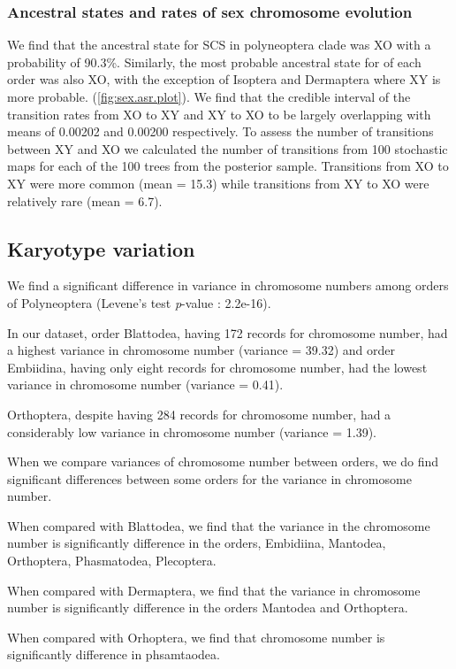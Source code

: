

\subsubsection{Ancestral states and rates of sex chromosome evolution}

We find that the ancestral state for SCS in polyneoptera clade was XO with a probability of 90.3\%.
Similarly, the most probable ancestral state for of each order was also XO, with the exception of Isoptera and Dermaptera where XY is more probable.
(\cref{fig:sex.asr.plot}).
We find that the credible interval of the transition rates from XO to XY and XY to XO to be largely overlapping with means of 0.00202 and 0.00200 respectively. 
To assess the number of transitions between XY and XO we calculated the number of transitions from 100 stochastic maps for each of the 100 trees from the posterior sample.
Transitions from XO to XY were more common (mean = 15.3) while transitions from XY to XO were relatively rare (mean = 6.7).

\subsection{Karyotype variation}
We find a significant difference in variance in chromosome numbers among orders of Polyneoptera (Levene's test \textit{p}-value : 2.2e-16). %

In our dataset, order Blattodea, having 172 records for chromosome number, had a highest variance in chromosome number (variance = 39.32) and order Embiidina, having only eight records for chromosome number, had the lowest variance in chromosome number (variance = 0.41).

Orthoptera, despite having 284 records for chromosome number, had a considerably low variance in chromosome number (variance = 1.39). 

When we compare variances of chromosome number between orders, we do find significant differences between some orders for the variance in chromosome number. 

When compared with Blattodea, we find that the variance in the chromosome number is significantly difference in the orders, Embidiina, Mantodea, Orthoptera, Phasmatodea, Plecoptera. 

When compared with Dermaptera, we find that the variance in chromosome number is significantly difference in the orders Mantodea and Orthoptera. 

When compared with Orhoptera, we find that chromosome number is significantly difference in phsamtaodea.

